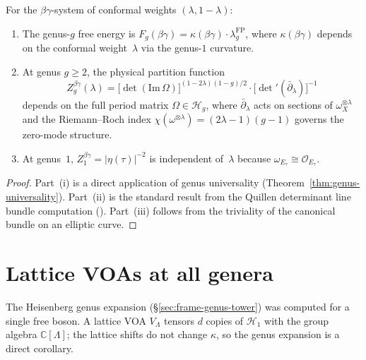 \begin{proposition}\label{prop:betagamma-all-genera}
For the $\beta\gamma$-system of conformal weights
$(\lambda, 1-\lambda)$:
\begin{enumerate}[label=\textup{(\roman*)}]
\item The genus-$g$ free energy is
$F_g(\beta\gamma) = \kappa(\beta\gamma) \cdot
\lambda_g^{\mathrm{FP}}$, where $\kappa(\beta\gamma)$
depends on the conformal weight~$\lambda$ via the
genus-$1$ curvature.
\item At genus $g \geq 2$, the physical partition function
\begin{equation}\label{eq:betagamma-partition}
Z_g^{\beta\gamma}(\lambda) =
\bigl[\det(\mathrm{Im}\,\Omega)\bigr]^{(1-2\lambda)(1-g)/2}
\cdot \bigl[\det'(\bar{\partial}_\lambda)\bigr]^{-1}
\end{equation}
depends on the full period matrix
$\Omega \in \mathcal{H}_g$, where
$\bar{\partial}_\lambda$ acts on sections of
$\omega_X^{\otimes \lambda}$ and the Riemann--Roch
index $\chi(\omega^{\otimes \lambda}) =
(2\lambda-1)(g-1)$ governs the zero-mode structure.
\item At genus~$1$, $Z_1^{\beta\gamma} =
|\eta(\tau)|^{-2}$ is independent of~$\lambda$
because $\omega_{E_\tau} \cong \mathcal{O}_{E_\tau}$.
\end{enumerate}
\end{proposition}

\begin{proof}
Part~(i) is a direct application of genus universality
(Theorem~\ref{thm:genus-universality}).
Part~(ii) is the standard result from the
Quillen determinant line bundle computation \cite{Quillen85}
(\ClaimStatusProvedElsewhere).
Part~(iii) follows from the triviality of the
canonical bundle on an elliptic curve.
\end{proof}

\section{Lattice VOAs at all genera}\label{sec:lattice-genera}

The Heisenberg genus expansion (\S\ref{sec:frame-genus-tower}) was computed for a single free boson.  A lattice VOA $V_\Lambda$ tensors $d$ copies of $\mathcal{H}_1$ with the group algebra $\mathbb{C}[\Lambda]$; the lattice shifts do not change $\kappa$, so the genus expansion is a direct corollary.


